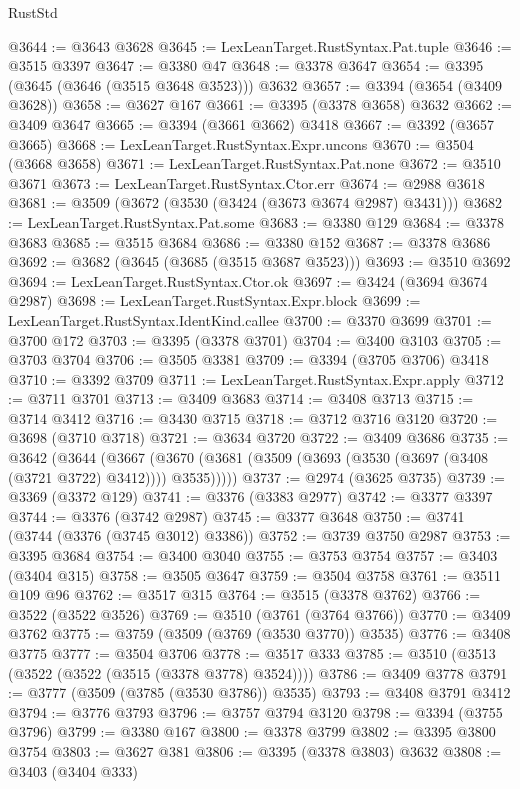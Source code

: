 \begin{lexlean}{RustStd}
\begin{coremodule}
@3644 := @3643 @3628
@3645 := LexLeanTarget.RustSyntax.Pat.tuple
@3646 := @3515 @3397
@3647 := @3380 @47
@3648 := @3378 @3647
@3654 := @3395 (@3645 (@3646 (@3515 @3648 @3523))) @3632
@3657 := @3394 (@3654 (@3409 @3628))
@3658 := @3627 @167
@3661 := @3395 (@3378 @3658) @3632
@3662 := @3409 @3647
@3665 := @3394 (@3661 @3662) @3418
@3667 := @3392 (@3657 @3665)
@3668 := LexLeanTarget.RustSyntax.Expr.uncons
@3670 := @3504 (@3668 @3658)
@3671 := LexLeanTarget.RustSyntax.Pat.none
@3672 := @3510 @3671
@3673 := LexLeanTarget.RustSyntax.Ctor.err
@3674 := @2988 @3618
@3681 := @3509 (@3672 (@3530 (@3424 (@3673 @3674 @2987) @3431)))
@3682 := LexLeanTarget.RustSyntax.Pat.some
@3683 := @3380 @129
@3684 := @3378 @3683
@3685 := @3515 @3684
@3686 := @3380 @152
@3687 := @3378 @3686
@3692 := @3682 (@3645 (@3685 (@3515 @3687 @3523)))
@3693 := @3510 @3692
@3694 := LexLeanTarget.RustSyntax.Ctor.ok
@3697 := @3424 (@3694 @3674 @2987)
@3698 := LexLeanTarget.RustSyntax.Expr.block
@3699 := LexLeanTarget.RustSyntax.IdentKind.callee
@3700 := @3370 @3699
@3701 := @3700 @172
@3703 := @3395 (@3378 @3701)
@3704 := @3400 @3103
@3705 := @3703 @3704
@3706 := @3505 @3381
@3709 := @3394 (@3705 @3706) @3418
@3710 := @3392 @3709
@3711 := LexLeanTarget.RustSyntax.Expr.apply
@3712 := @3711 @3701
@3713 := @3409 @3683
@3714 := @3408 @3713
@3715 := @3714 @3412
@3716 := @3430 @3715
@3718 := @3712 @3716 @3120
@3720 := @3698 (@3710 @3718)
@3721 := @3634 @3720
@3722 := @3409 @3686
@3735 := @3642
    (@3644
      (@3667 (@3670 (@3681 (@3509 (@3693 (@3530 (@3697 (@3408 (@3721 @3722) @3412)))) @3535)))))
@3737 := @2974 (@3625 @3735)
@3739 := @3369 (@3372 @129)
@3741 := @3376 (@3383 @2977)
@3742 := @3377 @3397
@3744 := @3376 (@3742 @2987)
@3745 := @3377 @3648
@3750 := @3741 (@3744 (@3376 (@3745 @3012) @3386))
@3752 := @3739 @3750 @2987
@3753 := @3395 @3684
@3754 := @3400 @3040
@3755 := @3753 @3754
@3757 := @3403 (@3404 @315)
@3758 := @3505 @3647
@3759 := @3504 @3758
@3761 := @3511 @109 @96
@3762 := @3517 @315
@3764 := @3515 (@3378 @3762)
@3766 := @3522 (@3522 @3526)
@3769 := @3510 (@3761 (@3764 @3766))
@3770 := @3409 @3762
@3775 := @3759 (@3509 (@3769 (@3530 @3770)) @3535)
@3776 := @3408 @3775
@3777 := @3504 @3706
@3778 := @3517 @333
@3785 := @3510 (@3513 (@3522 (@3522 (@3515 (@3378 @3778) @3524))))
@3786 := @3409 @3778
@3791 := @3777 (@3509 (@3785 (@3530 @3786)) @3535)
@3793 := @3408 @3791 @3412
@3794 := @3776 @3793
@3796 := @3757 @3794 @3120
@3798 := @3394 (@3755 @3796)
@3799 := @3380 @167
@3800 := @3378 @3799
@3802 := @3395 @3800 @3754
@3803 := @3627 @381
@3806 := @3395 (@3378 @3803) @3632
@3808 := @3403 (@3404 @333)

\end{coremodule}
\end{lexlean}
